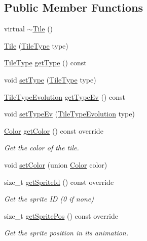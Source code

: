 \subsection*{Public Member Functions}
\begin{DoxyCompactItemize}
\item 
virtual \hyperlink{classarcade_1_1_tile_a38f5ed9f2ae16dbd42fa736ed5c984a6}{$\sim$\+Tile} ()
\item 
\hyperlink{classarcade_1_1_tile_abdc042c12eb8996f38a883c38c98efc6}{Tile} (\hyperlink{namespacearcade_a61ba576694ea309cdf2b4b66902408ca}{Tile\+Type} type)
\item 
\hyperlink{namespacearcade_a61ba576694ea309cdf2b4b66902408ca}{Tile\+Type} \hyperlink{classarcade_1_1_tile_a41277c86970f33f4a5a45d1e3233c45c}{get\+Type} () const
\item 
void \hyperlink{classarcade_1_1_tile_aefde0ece0a81584556ad5fdb17bb08a4}{set\+Type} (\hyperlink{namespacearcade_a61ba576694ea309cdf2b4b66902408ca}{Tile\+Type} type)
\item 
\hyperlink{namespacearcade_a2e0a64a64203f78c9efb84a1475a8cf4}{Tile\+Type\+Evolution} \hyperlink{classarcade_1_1_tile_a26e592479e0feb1ea584b3e96cb22ea4}{get\+Type\+Ev} () const
\item 
void \hyperlink{classarcade_1_1_tile_adac2e5710cd7651df15c33ba9aaa990f}{set\+Type\+Ev} (\hyperlink{namespacearcade_a2e0a64a64203f78c9efb84a1475a8cf4}{Tile\+Type\+Evolution} type)
\item 
\hyperlink{unionarcade_1_1_color}{Color} \hyperlink{classarcade_1_1_tile_a33f158dcb0b991ca565562a41ede70ba}{get\+Color} () const override
\begin{DoxyCompactList}\small\item\em Get the color of the tile. \end{DoxyCompactList}\item 
void \hyperlink{classarcade_1_1_tile_a07d360acc6d893cc23f972cf9bdb9c8c}{set\+Color} (union \hyperlink{unionarcade_1_1_color}{Color} color)
\item 
size\+\_\+t \hyperlink{classarcade_1_1_tile_afe2b3e7b4a6880b03772c240a2122d16}{get\+Sprite\+Id} () const override
\begin{DoxyCompactList}\small\item\em Get the sprite ID (0 if none) \end{DoxyCompactList}\item 
size\+\_\+t \hyperlink{classarcade_1_1_tile_a0dfe91e5896b8cfc3afac522d901be0a}{get\+Sprite\+Pos} () const override
\begin{DoxyCompactList}\small\item\em Get the sprite position in it\textquotesingle{}s animation. \end{DoxyCompactList}\item 

\end{DoxyCompactItemize}
